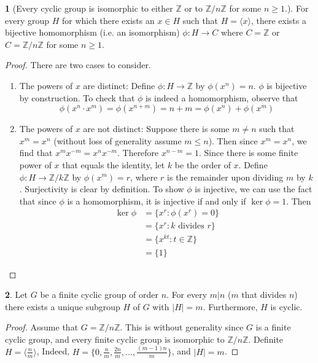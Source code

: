 \documentclass[12pt]{article}
\theoremstyle{definition}
\newtheorem{theorem}{\color{ForestGreen}{\textbf{Theorem}}}
\newcommand{\Z}{\mathbb{Z}}
\theoremstyle{definition}
\begin{document}
\begin{theorem}[Every cyclic group is isomorphic to either $\mathbb{Z}$ or to $\mathbb{Z} / n \mathbb{Z}$ for some $n \geq 1$.] For every group $H$ for which there exists an $x \in H$ such that $H = \langle x \rangle$, there exists a bijective homomorphism (i.e. an isomorphism) $\phi : H \to C$ where $C = \mathbb{Z}$ or $C = \mathbb{Z} / n \mathbb{Z}$ for some $n \geq 1$.
\end{theorem}
\begin{proof}
There are two cases to consider. 
\begin{enumerate}
	\item The powers of $x$ are distinct: Define $\phi : H \to \mathbb{Z}$ by $\phi(x^n) = n$. $\phi$ is bijective by construction. To check that $\phi$ is indeed a homomorphism, observe that
	\begin{equation}
		\phi(x^n \cdot x^m) = \phi(x^{n+m}) = n + m = \phi(x^n) + \phi(x^m)
	\end{equation}
	\item The powers of $x$ are not distinct: Suppose there is some $m \neq n$ such that $x^m = x^n$ (without loss of generality assume $m \leq n$). Then since $x^m = x^n$, we find that $x^m x^{-m} = x^n x^{-m}$. Therefore $x^{n-m} = 1$. Since there is some finite power of $x$ that equals the identity, let $k$ be the order of $x$. Define $\phi : H \to \mathbb{Z} / k \mathbb{Z}$ by $\phi(x^m) = r$, where $r$ is the remainder upon dividing $m$ by $k$. Surjectivity is clear by definition. To show $\phi$ is injective, we can use the fact that since $\phi$ is a homomorphism, it is injective if and only if $\ker{\phi} = 1$. Then
	\begin{align*}
		\ker{\phi} &= \{x^r : \phi(x^r) = 0 \} \\
		&= \{x^r : k \text{ divides } r \} \\
		&= \{x^{kt} : t \in \Z \} \\
		&= \{ 1 \} \tag{since $k$ is the order of $x$}
	\end{align*}
\end{enumerate}
\end{proof}

\begin{theorem}
Let $G$ be a finite cyclic group of order $n$. For every $m | n$ ($m$ that divides $n$) there exists a unique subgroup $H$ of $G$ with $|H|=m$. Furthermore, $H$ is cyclic.
\end{theorem}
\begin{proof}
Assume that $G = \mathbb{Z} / n \mathbb{Z}$. This is without generality since $G$ is a finite cyclic group, and every finite cyclic group is isomorphic to $\mathbb{Z} / n \mathbb{Z}$. Definite $H = \langle \frac{n}{m} \rangle$, Indeed, $H = \{ 0, \frac{n}{m}, \frac{2n}{m}, \ldots, \frac{(m-1)n}{m} \}$, and $|H| = m$. 
\end{proof}
\end{document}
